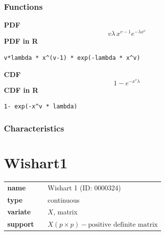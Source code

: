 \subsubsection*{Functions}

\smallskip \noindent \hspace{.2cm} \textbf{PDF} 
\begin{equation*}v\lambda \,x^{v-1} e^{-\lambda x^{v}}\end{equation*}
\smallskip \noindent \hspace{.2cm} \textbf{PDF in R}  
\begin{verbatim}v*lambda * x^(v-1) * exp(-lambda * x^v)\end{verbatim}
\smallskip \noindent \hspace{.2cm} \textbf{CDF} 
\begin{equation*}1- e^{-x^v \lambda}\end{equation*}
\smallskip \noindent \hspace{.2cm} \textbf{CDF in R} 
\begin{verbatim}1- exp(-x^v * lambda)\end{verbatim}
\smallskip
\subsubsection*{Characteristics}
\smallskip
\section*{Wishart1} 

  \bigskip 

\begin{tabular}{p{2cm}cl}
\textbf{name} & & Wishart 1 (ID: 0000324)\\ 
 
\textbf{type} & & continuous \\ 

\textbf{variate} & & $X$, matrix \\ 

\textbf{support} & & $X(p \times p) - \text{positive definite matrix}$
\end{tabular}


